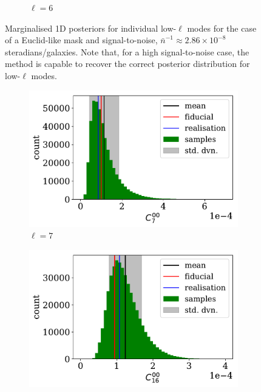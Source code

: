 \begin{figure}
\begin{center}
\begin{subfigure}{.5\textwidth}
  \caption{$\ell = 6$}
\end{subfigure}
\end{center}
\caption[Examples of marginalised 1D posteriors for individual low-$\ell$ modes for the case of a Euclid-like mask and signal-to-noise.]{Marginalised 1D posteriors for individual low-$\ell$ modes for the case of a Euclid-like mask and signal-to-noise, $\bar{n}^{-1}\approx 2.86\times 10^{-8}$ steradians/galaxies. Note that, for a high signal-to-noise case, the method is capable to recover the correct posterior distribution for low-$\ell$ modes.}
\label{fig:BPL:Euclid-Ells-HighSN-LowEll}
\end{figure}


\begin{figure}
\begin{subfigure}{.5\textwidth}
  \centering
  \includegraphics[width=\textwidth]{BPL-FIGS/Euclid-LN-PNoi-N32-HDens_HISTOGRAM-ell-07.pdf}
  \caption{$\ell = 7$}
\end{subfigure}
\begin{subfigure}{.5\textwidth}
  \centering
  \includegraphics[width=\textwidth]{BPL-FIGS/Euclid-LN-PNoi-N32-HDens_HISTOGRAM-ell-16.pdf}

\end{subfigure}
\end{figure}
